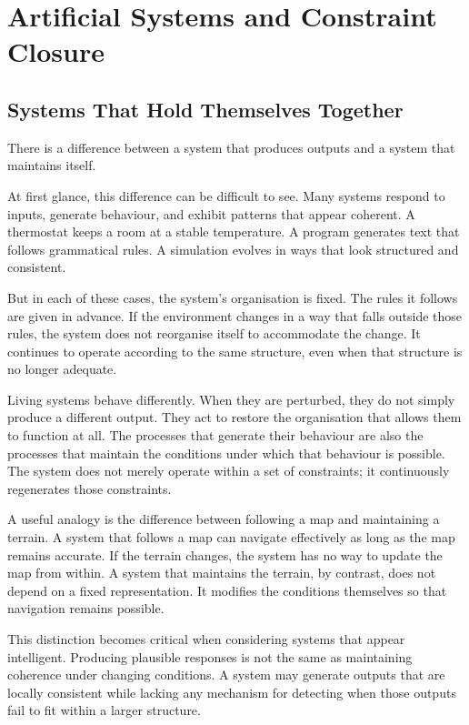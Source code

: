 \documentclass[11pt,openany]{book}
\begin{document}
\chapter{Artificial Systems and Constraint Closure}
\label{ch:artificial}

\section*{ Systems That Hold Themselves Together}

There is a difference between a system that produces outputs
and a system that maintains itself.

At first glance, this difference can be difficult to see.
Many systems respond to inputs, generate behaviour, and
exhibit patterns that appear coherent.  A thermostat keeps
a room at a stable temperature.  A program generates text
that follows grammatical rules.  A simulation evolves in
ways that look structured and consistent.

But in each of these cases, the system's organisation is
fixed.  The rules it follows are given in advance.  If the
environment changes in a way that falls outside those rules,
the system does not reorganise itself to accommodate the
change.  It continues to operate according to the same
structure, even when that structure is no longer adequate.

Living systems behave differently.  When they are perturbed,
they do not simply produce a different output.  They act to
restore the organisation that allows them to function at
all.  The processes that generate their behaviour are also
the processes that maintain the conditions under which that
behaviour is possible.  The system does not merely operate
within a set of constraints; it continuously regenerates
those constraints.

A useful analogy is the difference between following a map
and maintaining a terrain.  A system that follows a map can
navigate effectively as long as the map remains accurate.
If the terrain changes, the system has no way to update the
map from within.  A system that maintains the terrain, by
contrast, does not depend on a fixed representation.  It
modifies the conditions themselves so that navigation
remains possible.

This distinction becomes critical when considering systems
that appear intelligent.  Producing plausible responses is
not the same as maintaining coherence under changing
conditions.  A system may generate outputs that are locally
consistent while lacking any mechanism for detecting when
those outputs fail to fit within a larger structure.
\end{document}
